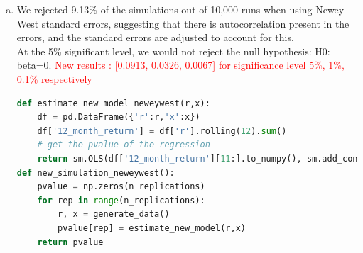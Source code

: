 \begin{enumerate}[(a)]
\item 
We rejected 9.13\% of the simulations out of 10,000 runs when using Newey-West standard errors, suggesting that there is autocorrelation present in the errors, and the standard errors are adjusted to account for this.\\
At the 5\% significant level, we would not reject the null hypothesis: H0: beta=0. 
\textcolor{red}{New results : [0.0913, 0.0326, 0.0067] for significance level 5\%, 1\%, 0.1\% respectively}

\begin{lstlisting}[language=Python, caption=Python code for new model with Newey-West, label={lst:q1a}, escapechar=|, frame=single, basicstyle=\small, showstringspaces=false, captionpos=b, breaklines=true, showspaces=false, showtabs=false, keywordstyle=\color{blue}, commentstyle=\color{gray}]
    def estimate_new_model_neweywest(r,x):
    df = pd.DataFrame({'r':r,'x':x})
    df['12_month_return'] = df['r'].rolling(12).sum()
    # get the pvalue of the regression
    return sm.OLS(df['12_month_return'][11:].to_numpy(), sm.add_constant(df['x'][:-11]).to_numpy()).fit(cov_type='HAC', cov_kwds={'maxlags': 11}).pvalues[1]
def new_simulation_neweywest():
    pvalue = np.zeros(n_replications)
    for rep in range(n_replications):
        r, x = generate_data()
        pvalue[rep] = estimate_new_model(r,x)
    return pvalue
    \end{lstlisting}
\end{enumerate}

